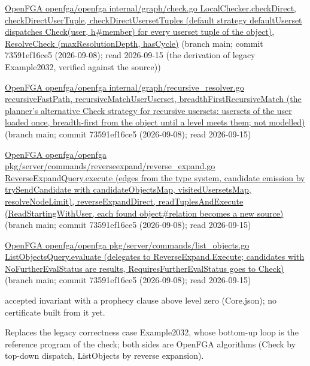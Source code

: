 \documentclass[10pt]{article}
\begin{document}
\begin{description}[leftmargin=2.6cm,style=nextline,itemsep=1pt]
\item[Sources] {\raggedright \href{https://github.com/openfga/openfga/blob/main/internal/graph/check.go}{OpenFGA openfga/openfga internal/graph/check.go LocalChecker.checkDirect, checkDirectUserTuple, checkDirectUsersetTuples (default strategy defaultUserset dispatches Check(user, h\#member) for every userset tuple of the object), ResolveCheck (maxResolutionDepth, hasCycle)} (branch main; commit 73591ef16ce5 (2026-09-08); read 2026-09-15 (the derivation of legacy Example2032, verified against the source)) \par \href{https://github.com/openfga/openfga/blob/main/internal/graph/recursive_resolver.go}{OpenFGA openfga/openfga internal/graph/recursive\_resolver.go recursiveFastPath, recursiveMatchUserUserset, breadthFirstRecursiveMatch (the planner's alternative Check strategy for recursive usersets: usersets of the user loaded once, breadth-first from the object until a level meets them; not modelled)} (branch main; commit 73591ef16ce5 (2026-09-08); read 2026-09-15) \par \href{https://github.com/openfga/openfga/blob/main/pkg/server/commands/reverseexpand/reverse_expand.go}{OpenFGA openfga/openfga pkg/server/commands/reverseexpand/reverse\_expand.go ReverseExpandQuery.execute (edges from the type system, candidate emission by trySendCandidate with candidateObjectsMap, visitedUsersetsMap, resolveNodeLimit), reverseExpandDirect, readTuplesAndExecute (ReadStartingWithUser, each found object\#relation becomes a new source)} (branch main; commit 73591ef16ce5 (2026-09-08); read 2026-09-15) \par \href{https://github.com/openfga/openfga/blob/main/pkg/server/commands/list_objects.go}{OpenFGA openfga/openfga pkg/server/commands/list\_objects.go ListObjectsQuery.evaluate (delegates to ReverseExpand.Execute; candidates with NoFurtherEvalStatus are results, RequiresFurtherEvalStatus goes to Check)} (branch main; commit 73591ef16ce5 (2026-09-08); read 2026-09-15)\par}

\item[Prophecy] accepted invariant with a prophecy clause above level zero (Core.json); no certificate built from it yet.

\item[Note] Replaces the legacy correctness case Example2032, whose bottom-up loop is the reference program of the check; both sides are OpenFGA algorithms (Check by top-down dispatch, ListObjects by reverse expansion).

\end{description}
\end{document}
